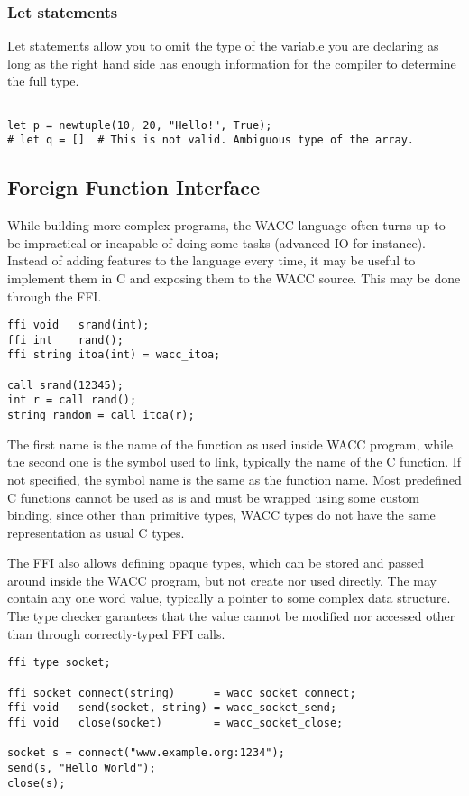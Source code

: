\documentclass{article}
\begin{document}
\subsubsection{Let statements}
Let statements allow you to omit the type of the variable you are declaring as long as the right hand side has enough information for the compiler to determine the full type.
\begin{lstlisting}

let p = newtuple(10, 20, "Hello!", True);
# let q = []  # This is not valid. Ambiguous type of the array.
\end{lstlisting}


\subsection{Foreign Function Interface}
While building more complex programs, the WACC language often turns up to be impractical or incapable of doing some tasks
(advanced IO for instance). Instead of adding features to the language every time, it may be useful to implement them in C
and exposing them to the WACC source. This may be done through the FFI.

\begin{lstlisting}
ffi void   srand(int);
ffi int    rand();
ffi string itoa(int) = wacc_itoa;

call srand(12345);
int r = call rand();
string random = call itoa(r);
\end{lstlisting}

The first name is the name of the function as used inside WACC program, while the second one is the symbol used to link,
typically the name of the C function. If not specified, the symbol name is the same as the function name.
Most predefined C functions cannot be used as is and must be wrapped using some custom binding, since other than primitive
types, WACC types do not have the same representation as usual C types.

The FFI also allows defining opaque types, which can be stored and passed around inside the WACC program, but not create nor
used directly. The may contain any one word value, typically a pointer to some complex data structure. The type checker
garantees that the value cannot be modified nor accessed other than through correctly-typed FFI calls.

\begin{lstlisting}
ffi type socket;

ffi socket connect(string)      = wacc_socket_connect;
ffi void   send(socket, string) = wacc_socket_send;
ffi void   close(socket)        = wacc_socket_close;

socket s = connect("www.example.org:1234");
send(s, "Hello World");
close(s);
\end{lstlisting}
\end{document}

